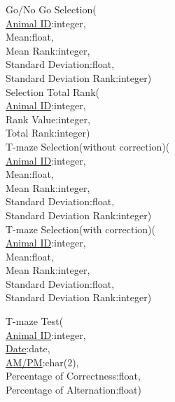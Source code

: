 \documentclass[12pt]{article}
\begin{document}
	\indent Go/No Go Selection(\\
	\indent\indent \underline{Animal ID}:integer,\\
	\indent\indent Mean:float,\\
	\indent\indent Mean Rank:integer,\\
	\indent\indent Standard Deviation:float,\\
	\indent\indent Standard Deviation Rank:integer)\\
	
	\indent Selection Total Rank(\\
	\indent\indent \underline{Animal ID}:integer,\\
	\indent\indent Rank Value:integer,\\
	\indent\indent Total Rank:integer)\\
	
	\indent T-maze Selection(without correction)(\\
	\indent\indent \underline{Animal ID}:integer,\\
	\indent\indent Mean:float,\\
	\indent\indent Mean Rank:integer,\\
	\indent\indent Standard Deviation:float,\\
	\indent\indent Standard Deviation Rank:integer)\\
	
	\indent T-maze Selection(with correction)(\\
	\indent\indent \underline{Animal ID}:integer,\\
	\indent\indent Mean:float,\\
	\indent\indent Mean Rank:integer,\\
	\indent\indent Standard Deviation:float,\\
	\indent\indent Standard Deviation Rank:integer)\\
	
	\newpage	
	
	\indent T-maze Test(\\
	\indent\indent \underline{Animal ID}:integer,\\
	\indent\indent \underline{Date}:date,\\
	\indent\indent \underline{AM/PM}:char(2),\\
	\indent\indent Percentage of Correctness:float,\\
	\indent\indent Percentage of Alternation:float)\\
	
\end{document}
